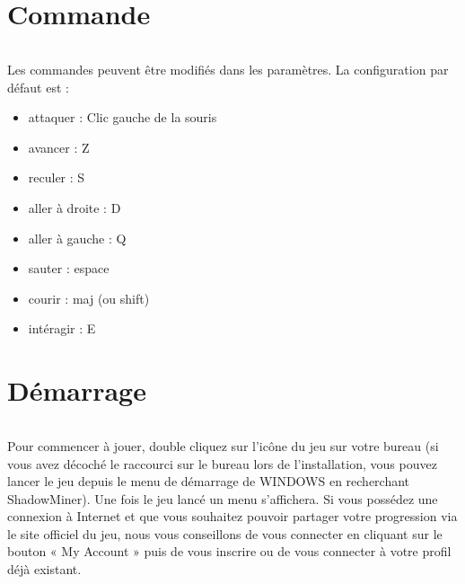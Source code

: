 \documentclass[titlepage, 13px, a4paper]{report}
\begin{document}

\newpage


\part{Commande} 
\paragraph*{} \hspace{0pt}
Les commandes peuvent être modifiés dans les paramètres. La configuration par défaut est : \\
{\begin{itemize}
	\item attaquer : Clic gauche de la souris
	\item avancer : Z
	\item reculer : S
	\item aller à droite : D
	\item aller à gauche : Q
	\item sauter : espace
	\item courir : maj (ou shift)
	\item intéragir :  E \\
\end{itemize}}


\newpage


\part{Démarrage}
\paragraph*{} \hspace{0pt}
Pour commencer à jouer, double cliquez sur l’icône du jeu sur votre bureau (si vous avez décoché le raccourci sur 
le bureau lors de l'installation, vous pouvez lancer le jeu depuis le menu de démarrage de WINDOWS en recherchant ShadowMiner). 
Une fois le jeu lancé un menu s'affichera. Si vous possédez une connexion à Internet et que vous souhaitez pouvoir 
partager votre progression via le site officiel du jeu, nous vous conseillons de vous connecter en cliquant sur le 
bouton « My Account » puis de vous inscrire ou de vous connecter à votre profil déjà existant. \\
\end{document}
